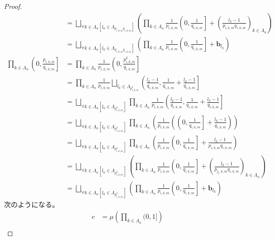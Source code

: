 \documentclass[dvipdfmx]{jsarticle}
\begin{document}
\begin{proof}
\begin{align*}
&= \bigsqcup_{\forall k \in \varLambda_{n}\left[ l_{k} \in \varLambda_{p_{i,k,m}q_{i,k,m}} \right]} \left( \prod_{k \in \varLambda_{n}} {\frac{1}{p_{i,k,m}}\left( 0,\frac{1}{q_{i,k,m}} \right]} + \left( \frac{l_{k} - 1}{p_{i,k,m}q_{i,k,m}} \right)_{k \in \varLambda_{n}} \right)\\
&= \bigsqcup_{\forall k \in \varLambda_{n}\left[ l_{k} \in \varLambda_{p_{i,k,m}q_{i,k,m}} \right]} \left( \prod_{k \in \varLambda_{n}} {\frac{1}{p_{i,k,m}}\left( 0,\frac{1}{q_{i,k,m}} \right]} + \mathbf{b}_{l_{k}} \right)\\
\prod_{k \in \varLambda_{n}} \left( 0,\frac{p_{i,k,m}}{q_{i,k,m}} \right] &= \prod_{k \in \varLambda_{n}} {\frac{1}{p_{i,k,m}}\left( 0,\frac{p_{i,k,m}^{2}}{q_{i,k,m}} \right]}\\
&= \prod_{k \in \varLambda_{n}} {\frac{1}{p_{i,k,m}}\bigsqcup_{l_{k} \in \varLambda_{p_{i,k,m}^{2}}} \left( \frac{l_{k} - 1}{q_{i,k,m}},\frac{1}{q_{i,k,m}} + \frac{l_{k} - 1}{q_{i,k,m}} \right]}\\
&= \bigsqcup_{\forall k \in \varLambda_{n}\left[ l_{k} \in \varLambda_{p_{i,k,m}^{2}} \right]} {\prod_{k \in \varLambda_{n}} {\frac{1}{p_{i,k,m}}\left( \frac{l_{k} - 1}{q_{i,k,m}},\frac{1}{q_{i,k,m}} + \frac{l_{k} - 1}{q_{i,k,m}} \right]}}\\
&= \bigsqcup_{\forall k \in \varLambda_{n}\left[ l_{k} \in \varLambda_{p_{i,k,m}^{2}} \right]} {\prod_{k \in \varLambda_{n}} \left( \frac{1}{p_{i,k,m}}\left( \left( 0,\frac{1}{q_{i,k,m}} \right] + \frac{l_{k} - 1}{q_{i,k,m}} \right) \right)}\\
&= \bigsqcup_{\forall k \in \varLambda_{n}\left[ l_{k} \in \varLambda_{p_{i,k,m}^{2}} \right]} {\prod_{k \in \varLambda_{n}} \left( \frac{1}{p_{i,k,m}}\left( 0,\frac{1}{q_{i,k,m}} \right] + \frac{l_{k} - 1}{p_{i,k,m}q_{i,k,m}} \right)}\\
&= \bigsqcup_{\forall k \in \varLambda_{n}\left[ l_{k} \in \varLambda_{p_{i,k,m}^{2}} \right]} \left( \prod_{k \in \varLambda_{n}} {\frac{1}{p_{i,k,m}}\left( 0,\frac{1}{q_{i,k,m}} \right]} + \left( \frac{l_{k} - 1}{p_{j_{i},k,m}q_{i,k,m}} \right)_{k \in \varLambda_{n}} \right)\\
&= \bigsqcup_{\forall k \in \varLambda_{n}\left[ l_{k} \in \varLambda_{p_{i,k,m}^{2}} \right]} \left( \prod_{k \in \varLambda_{n}} {\frac{1}{p_{i,k,m}}\left( 0,\frac{1}{q_{i,k,m}} \right]} + \mathbf{b}_{l_{k}} \right)
\end{align*}
次のようになる。
\begin{align*}
c &= \mu\left( \prod_{k \in \varLambda_{n}} (0,1] \right)\\

\end{align*}
\end{proof}
\end{document}
